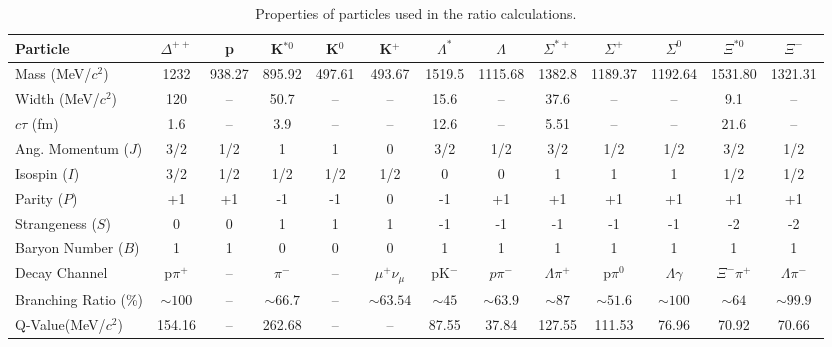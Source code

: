 \hspace*{-1cm}
\begin{table}[!htb] 
\hspace*{-1cm}
\caption{\label{opt} Properties of particles used in the ratio calculations.}
%
\hspace*{-1cm}
%
 \begin{tabular}{lcccccccccccc}
\hline
\hline
Particle&$\Delta^{++}$ &  p & K$^{*0}$ &K$^{0} $ &K$^{+} $ & $\Lambda^{*}$ & $\Lambda$& $\Sigma^{*+}$  & $\Sigma^{+}$ & $\Sigma^{0}$ & $\Xi^{*0}$ & $\Xi^{-}$\\
\hline
Mass (MeV/$c^{2}$)&1232&938.27&895.92&497.61&493.67&1519.5&1115.68&1382.8&1189.37&1192.64&1531.80&1321.31\\
Width (MeV/$c^{2}$)&120&--&50.7&--&--&15.6&--&37.6&--&--&9.1&--\\
$c\tau$ (fm)&1.6&--&3.9&--&--&12.6&--&5.51&--&--&$21.6$&--\\
Ang. Momentum ($J$)&3/2&1/2&1&1&0&3/2&1/2&3/2&1/2&1/2&3/2&1/2\\
Isospin ($I$)&3/2&1/2&1/2&1/2&1/2&0&0&1&1&1&1/2&1/2\\
Parity ($P$)&+1&+1&-1&-1&0&-1&+1&+1&+1&+1&+1&+1\\
Strangeness ($S$)&0&0&1&1&1&-1&-1&-1&-1&-1&-2&-2\\
Baryon Number ($B$)&1&1&0&0&0&1&1&1&1&1&1&1\\
Decay Channel&p$\pi^{+}$&--&$\pi^{-}$&--&$\mu^{+}\nu_{\mu}$&pK$^{-}$&$p\pi^{-}$&$\Lambda\pi^{+}$&p$\pi^{0}$&$\Lambda\gamma$&$\Xi^{-}\pi^{+}$&$\Lambda\pi^{-}$\\
Branching Ratio (\%)&$\sim100$&--&$\sim66.7$&--&$\sim63.54$&$\sim45$&$\sim63.9$&$\sim87$&$\sim51.6$&$\sim100$&$\sim64$&$\sim99.9$\\
Q-Value(MeV/$c^{2}$)&154.16&--&262.68&--&--&87.55&37.84&127.55&111.53&76.96&70.92&70.66\\
 \hline
 \hline
\end{tabular}
\end{table}

